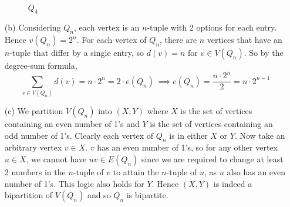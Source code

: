 \begin{ans}
\begin{itemize}
\begin{figure}[h!]
\begin{minipage}{\textwidth}
\begin{center}
{
	}
	\\
	$Q_4$
	\end{center}
	\end{minipage}
	\end{figure}
	\item[(b)] Considering $Q_n$, each vertex is an $n$-tuple with 2 options for each entry. Hence $v(Q_n) = 2^n$. For each vertex of $Q_n$, there are $n$ vertices that have an $n$-tuple that differ by a single entry, so $d(v) = n$ for $v \in V(Q_n)$. So by the degree-sum formula,
	\begin{equation*}
		\sum_{v \in V(Q_n)} d(v) = n \cdot 2^n = 2 \cdot e(Q_n) \
		\implies e(Q_n) = \frac{n \cdot 2^n}{2} = n \cdot 2^{n-1}
	\end{equation*}
	\item[(c)] We partition $V(Q_n)$ into $(X,Y)$ where $X$ is the set of vertices containing an even number of 1's and $Y$ is the set of vertices containing an odd number of 1's. Clearly each vertex of $Q_n$ is in either $X$ or $Y$. Now take an arbitrary vertex $v \in X$. $v$ has an even number of 1's, so for any other vertex $u \in X$, we cannot have $uv \in E(Q_n)$ since we are required to change at least 2 numbers in the $n$-tuple of $v$ to attain the $n$-tuple of $u$, as $u$ also has an even number of 1's. This logic also holds for $Y$. Hence $(X,Y)$ is indeed a bipartition of $V(Q_n)$ and so $Q_n$ is bipartite.
\end{itemize}
\end{ans}

